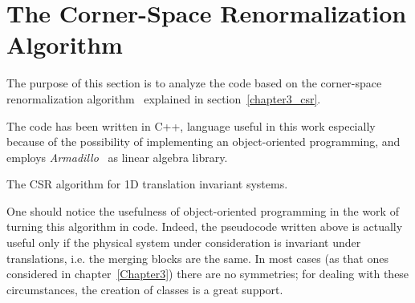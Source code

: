 \chapter{The Corner-Space Renormalization Algorithm} %
\label{AppendixA}

The purpose of this section is to analyze the code based on the corner-space renormalization algorithm~\cite{PhysRevLett.115.080604} explained in section~\ref{chapter3_csr}.

The code has been written in C++, language useful in this work especially because of the possibility of implementing an object-oriented programming, and employs \emph{Armadillo}~\cite{arma:book, arma:art} as linear algebra library. 
\medskip

\begin{algorithm}[H]
\label{algo_trans_inv}
\SetAlgoLined
\DontPrintSemicolon
{}
\bigskip
{}

\caption{The CSR algorithm for 1D translation invariant systems.}
\label{pseudocode}
\end{algorithm}

One should notice the usefulness of object-oriented programming in the work of turning this algorithm in code. Indeed, the pseudocode written above is actually useful only if the physical system under consideration is invariant under translations, i.e. the merging blocks are the same. In most cases (as that ones considered in chapter~\ref{Chapter3}) there are no symmetries; for dealing with these circumstances, the creation of classes is a great support.

